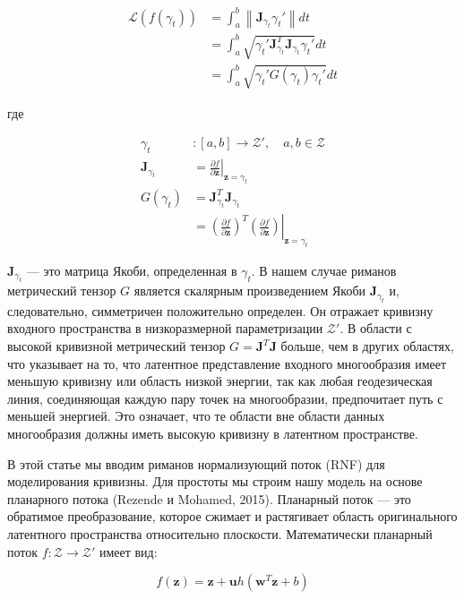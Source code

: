 \documentclass{article}
\begin{document}
\[
\begin{aligned}
\mathcal{L}(f(\gamma_t)) & = \int_{a}^{b} \left\| \mathbf{J}_{\gamma_t} \gamma_t' \right\| dt \\
& = \int_{a}^{b} \sqrt{\gamma_t' \mathbf{J}_{\gamma_t}^T \mathbf{J}_{\gamma_t} \gamma_t'} dt \\
& = \int_{a}^{b} \sqrt{\gamma_t' G(\gamma_t) \gamma_t'} dt
\end{aligned}
\]

где

\[
\begin{aligned}
\gamma_t & : [a, b] \rightarrow \mathcal{Z}', \quad a, b \in \mathcal{Z} \\
\mathbf{J}_{\gamma_t} & = \left. \frac{\partial f}{\partial \mathbf{z}} \right|_{\mathbf{z} = \gamma_t} \\
G(\gamma_t) & = \mathbf{J}_{\gamma_t}^T \mathbf{J}_{\gamma_t} \\
& = \left. \left( \frac{\partial f}{\partial \mathbf{z}} \right)^T \left( \frac{\partial f}{\partial \mathbf{z}} \right) \right|_{\mathbf{z} = \gamma_t}
\end{aligned}
\]

\(\mathbf{J}_{\gamma_t}\) — это матрица Якоби, определенная в \(\gamma_t\). В нашем случае риманов метрический тензор \(G\) является скалярным произведением Якоби \(\mathbf{J}_{\gamma_t}\) и, следовательно, симметричен положительно определен. Он отражает кривизну входного пространства в низкоразмерной параметризации \(\mathcal{Z}'\). В области с высокой кривизной метрический тензор \(G = \mathbf{J}^T \mathbf{J}\) больше, чем в других областях, что указывает на то, что латентное представление входного многообразия имеет меньшую кривизну или область низкой энергии, так как любая геодезическая линия, соединяющая каждую пару точек на многообразии, предпочитает путь с меньшей энергией. Это означает, что те области вне области данных многообразия должны иметь высокую кривизну в латентном пространстве.

В этой статье мы вводим риманов нормализующий поток (RNF) для моделирования кривизны. Для простоты мы строим нашу модель на основе планарного потока (Rezende и Mohamed, 2015). Планарный поток — это обратимое преобразование, которое сжимает и растягивает область оригинального латентного пространства относительно плоскости. Математически планарный поток \(f: \mathcal{Z} \rightarrow \mathcal{Z}'\) имеет вид:

\[
f(\mathbf{z}) = \mathbf{z} + \mathbf{u} h(\mathbf{w}^T \mathbf{z} + b)
\]
\end{document}
